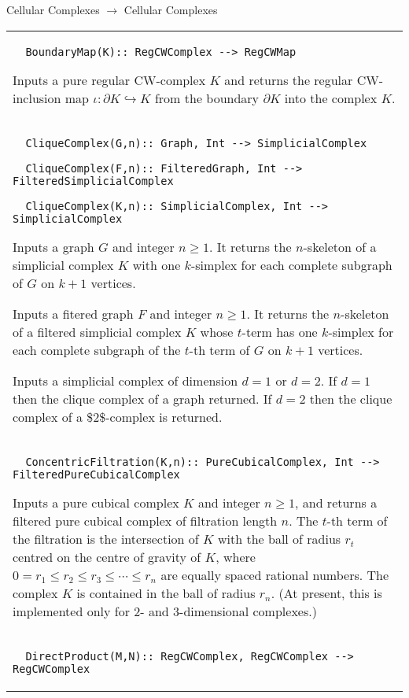 \documentclass[a4paper,11pt]{report}
\begin{document}
{ Cellular Complexes $\longrightarrow$ Cellular Complexes \begin{center}
\begin{tabular}{|l|} \index{BoundaryMap} 
\begin{verbatim}  BoundaryMap(K):: RegCWComplex --> RegCWMap
\end{verbatim}


 

 Inputs a pure regular CW-complex $K$ and returns the regular CW-inclusion map $\iota \colon \partial K \hookrightarrow K$ from the boundary $\partial K$ into the complex $K$. \\
 \index{CliqueComplex} 
\begin{verbatim}  CliqueComplex(G,n):: Graph, Int --> SimplicialComplex
\end{verbatim}
 
\begin{verbatim}  CliqueComplex(F,n):: FilteredGraph, Int --> FilteredSimplicialComplex
\end{verbatim}
 
\begin{verbatim}  CliqueComplex(K,n):: SimplicialComplex, Int --> SimplicialComplex
\end{verbatim}


 

 Inputs a graph $G$ and integer $n \ge 1$. It returns the $n$-skeleton of a simplicial complex $K$ with one $k$-simplex for each complete subgraph of $G$ on $k+1$ vertices. 

 Inputs a fitered graph $F$ and integer $n \ge 1$. It returns the $n$-skeleton of a filtered simplicial complex $K$ whose $t$-term has one $k$-simplex for each complete subgraph of the $t$-th term of $G$ on $k+1$ vertices. 

 Inputs a simplicial complex of dimension $d=1$ or $d=2$. If $d=1$ then the clique complex of a graph returned. If $d=2$ then the clique complex of a \$2\$-complex is returned. \\
 \index{ConcentricFiltration} 
\begin{verbatim}  ConcentricFiltration(K,n):: PureCubicalComplex, Int --> FilteredPureCubicalComplex
\end{verbatim}


 

 Inputs a pure cubical complex $K$ and integer $n \ge 1$, and returns a filtered pure cubical complex of filtration length $n$. The $t$-th term of the filtration is the intersection of $K$ with the ball of radius $r_t$ centred on the centre of gravity of $K$, where $0=r_1 \le r_2 \le r_3 \le \cdots \le r_n$ are equally spaced rational numbers. The complex $K$ is contained in the ball of radius $r_n$. (At present, this is implemented only for $2$- and $3$-dimensional complexes.) \\
 \index{DirectProduct} 
\begin{verbatim}  DirectProduct(M,N):: RegCWComplex, RegCWComplex --> RegCWComplex
\end{verbatim}
 

\end{tabular}
\end{center}}
\end{document}
